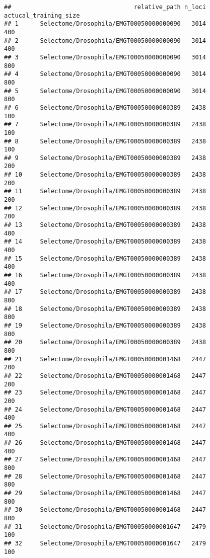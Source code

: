 \documentclass[
]{article}
\begin{document}
\begin{verbatim}
##                                  relative_path n_loci actucal_training_size
## 1      Selectome/Drosophila/EMGT00050000000090   3014                   400
## 2      Selectome/Drosophila/EMGT00050000000090   3014                   400
## 3      Selectome/Drosophila/EMGT00050000000090   3014                   800
## 4      Selectome/Drosophila/EMGT00050000000090   3014                   800
## 5      Selectome/Drosophila/EMGT00050000000090   3014                   800
## 6      Selectome/Drosophila/EMGT00050000000389   2438                   100
## 7      Selectome/Drosophila/EMGT00050000000389   2438                   100
## 8      Selectome/Drosophila/EMGT00050000000389   2438                   100
## 9      Selectome/Drosophila/EMGT00050000000389   2438                   200
## 10     Selectome/Drosophila/EMGT00050000000389   2438                   200
## 11     Selectome/Drosophila/EMGT00050000000389   2438                   200
## 12     Selectome/Drosophila/EMGT00050000000389   2438                   200
## 13     Selectome/Drosophila/EMGT00050000000389   2438                   400
## 14     Selectome/Drosophila/EMGT00050000000389   2438                   400
## 15     Selectome/Drosophila/EMGT00050000000389   2438                   400
## 16     Selectome/Drosophila/EMGT00050000000389   2438                   400
## 17     Selectome/Drosophila/EMGT00050000000389   2438                   800
## 18     Selectome/Drosophila/EMGT00050000000389   2438                   800
## 19     Selectome/Drosophila/EMGT00050000000389   2438                   800
## 20     Selectome/Drosophila/EMGT00050000000389   2438                   800
## 21     Selectome/Drosophila/EMGT00050000001468   2447                   200
## 22     Selectome/Drosophila/EMGT00050000001468   2447                   200
## 23     Selectome/Drosophila/EMGT00050000001468   2447                   200
## 24     Selectome/Drosophila/EMGT00050000001468   2447                   400
## 25     Selectome/Drosophila/EMGT00050000001468   2447                   400
## 26     Selectome/Drosophila/EMGT00050000001468   2447                   400
## 27     Selectome/Drosophila/EMGT00050000001468   2447                   800
## 28     Selectome/Drosophila/EMGT00050000001468   2447                   800
## 29     Selectome/Drosophila/EMGT00050000001468   2447                   800
## 30     Selectome/Drosophila/EMGT00050000001468   2447                   800
## 31     Selectome/Drosophila/EMGT00050000001647   2479                   100
## 32     Selectome/Drosophila/EMGT00050000001647   2479                   100

\end{verbatim}
\end{document}
